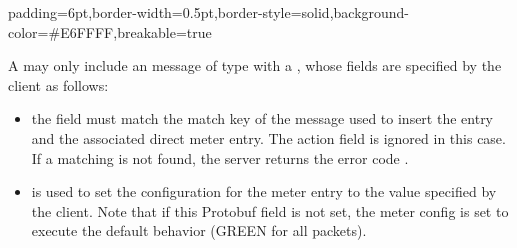\documentclass[11pt]{article}
\begin{document}
{%
\begin{mdbmargintb}{6pt}{6pt}%
\begin{mdblock}{padding=6pt,border-width=0.5pt,border-style=solid,background-color=\#E6FFFF,breakable=true}%
\begin{mdpre}%
\end{mdpre}%
\end{mdblock}%
\end{mdbmargintb}%

\noindent{}A  may only include an  message of type  with a
, whose fields are specified by the client as follows:%

\begin{itemize}%

\item{}
the  field must match the match key of the 
message used to insert the entry and the associated direct meter entry. The
action field is ignored in this case. If a matching  is not found,
the server returns the error code .%

\item{}
 is used to set the configuration for the meter entry to the value
specified by the client. Note that if this Protobuf field is not set, the
meter config is set to execute the default behavior (GREEN for all packets).%


\end{itemize}}
\end{document}
